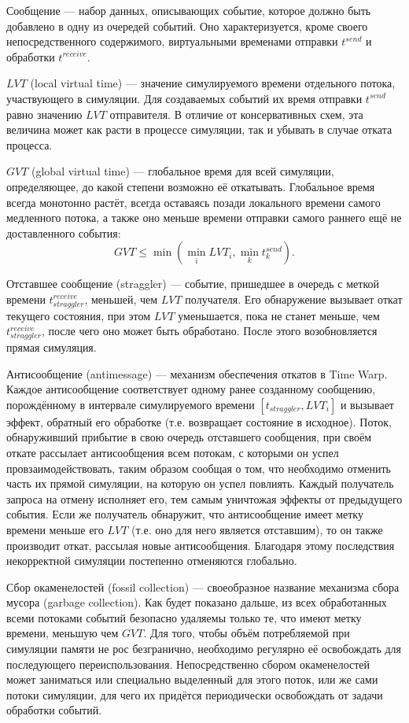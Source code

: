 \begin{itemize*}
    \item Сообщение — набор данных, описывающих событие, которое должно быть добавлено в одну из очередей событий. Оно характеризуется, кроме своего непосредственного содержимого, виртуальными временами отправки $t^{send}$ и обработки $t^{receive}$.
    \item $LVT$ (\abbr local virtual time) — значение симулируемого времени отдельного потока, участвующего в симуляции. Для создаваемых событий их время отправки $t^{send}$ равно значению $LVT$ отправителя. В отличие от консервативных схем, эта величина может как расти в процессе симуляции, так и убывать в случае отката процесса.
    \item $GVT$ (\abbr global virtual time) — глобальное время для всей симуляции, определяющее, до какой степени возможно её откатывать.  Глобальное время всегда монотонно растёт, всегда оставаясь позади локального времени самого медленного потока, а также оно меньше времени отправки самого раннего ещё не доставленного события:
    $$GVT \leq \min \left( \min\limits_{i} LVT_{i}, \min\limits_{k} t^{send}_k  \right).$$
    \item Отставшее сообщение (\abbr straggler) — событие, пришедшее в очередь с меткой времени $t^{receive}_{straggler}$, меньшей, чем $LVT$ получателя. Его обнаружение вызывает откат текущего состояния, при этом $LVT$ уменьшается, пока не станет меньше, чем $t^{receive}_{straggler}$, после чего оно может быть обработано. После этого возобновляется прямая симуляция.
    \item Антисообщение (\abbr antimessage) — механизм обеспечения откатов в Time Warp. Каждое антисообщение соответствует одному ранее созданному сообщению, порождённому в интервале симулируемого времени $[t_{straggler}, LVT_i]$ и  вызывает эффект, обратный его обработке (т.е. возвращает состояние в исходное). Поток, обнаруживший прибытие в свою очередь отставшего сообщения, при своём откате рассылает антисообщения всем потокам, с которыми он успел провзаимодействовать, таким образом сообщая о том, что необходимо отменить часть их прямой симуляции, на которую он успел повлиять. Каждый получатель запроса на отмену исполняет его, тем самым уничтожая эффекты от предыдущего события. Если же получатель обнаружит, что антисообщение имеет метку времени меньше его $LVT$ (т.е. оно для него является отставшим), то он также производит откат, рассылая новые антисообщения. Благодаря этому последствия некорректной симуляции постепенно отменяются глобально.
    
    \item Сбор окаменелостей (\abbr fossil collection) — своеобразное название механизма сбора мусора (\abbr garbage collection). Как будет показано дальше, из всех обработанных всеми потоками событий безопасно удаляемы только те, что имеют метку времени, меньшую чем $GVT$. Для того, чтобы объём потребляемой при симуляции памяти не рос безгранично, необходимо регулярно её освобождать для последующего переиспользования. Непосредственно сбором окаменелостей может заниматься или специально выделенный для этого поток, или же сами потоки симуляции, для чего их придётся периодически освобождать от задачи обработки событий.
\end{itemize*}

